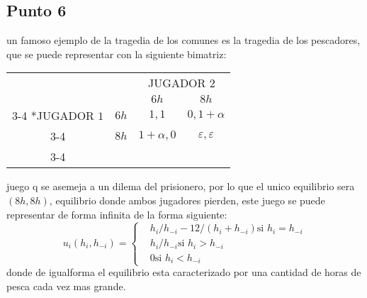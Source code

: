 \documentclass[11pt]{article}
\begin{document}
\subsection{Punto 6}

\begin{flushleft}
    un famoso ejemplo de la tragedia de los comunes es la tragedia de los pescadores, que se puede representar con la siguiente bimatriz:
    \begin{center}    
        \setlength{\extrarowheight}{0pt}
        \begin{tabular}{cc|c|c|}
            & \multicolumn{1}{c}{} & \multicolumn{2}{c}{JUGADOR $2$}\\
            & \multicolumn{1}{c}{} & \multicolumn{1}{c}{$6h$}  & \multicolumn{1}{c}{$8h$} \\\cline{3-4}
            \multirow{2}*{JUGADOR $1$}  & $6h$ & $1,1$ & $0,1+\alpha$ \\\cline{3-4}
            & $8h$ & $1+\alpha,0$ & $\varepsilon,\varepsilon$ \\\cline{3-4}
        \end{tabular}
    \end{center}
    juego q se asemeja a un dilema del prisionero, por lo que el unico equilibrio sera $(8h,8h)$, equilibrio donde ambos jugadores pierden,
    este juego se puede representar de forma infinita de la forma siguiente:
    $$
    u_i(h_i,h_{-i})=\begin{cases}
        &h_i/h_{-i}-12/(h_i+h_{-i}) \text{si } h_i=h_{-i}\\
        &h_i/h_{-i} \text{si } h_i > h_{-i}\\
        &0 \text{si } h_i<h_{-i}
    \end{cases}
    $$
    donde de igualforma el equilibrio esta caracterizado por una cantidad de horas de pesca cada vez mas grande.
\end{flushleft}
\end{document}
